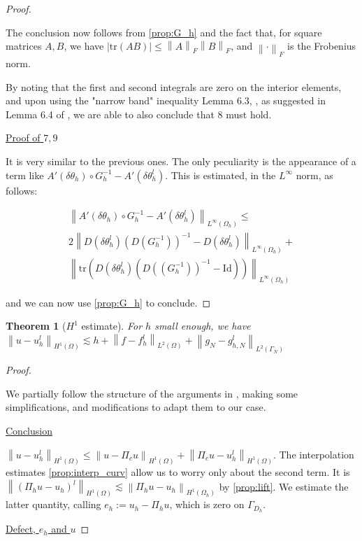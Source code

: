 \documentclass[english,a4paper,9pt,oneside]{scrbook}	%
\theoremstyle{break}
\newtheorem{thm}[equation]{Theorem}
\newenvironment{mproof}[1][\proofname]{%
  \begin{proof}[#1]$ $\par\nobreak\ignorespaces
}{%
  \end{proof}
}
\renewcommand*{\proofname}{Proof}
\theoremstyle{remark}
\newcommand{\norm}[1]{\left\lVert#1\right\rVert}
\newcommand{\tr}{\text{tr}}
\newcommand{\id}{\text{Id}}
\newcommand{\te}{\theta}
\begin{document}
\begin{appendices}
\begin{mproof}
The conclusion now follows from \cref{prop:G_h} and the fact that, for square matrices $A,B$, we have $|\tr(AB)|\leq \norm{A}_F\norm{B}_F$, and $\norm{\cdot }_F$ is the Frobenius norm.

By noting that the first and second integrals are zero on the interior elements, and upon using the "narrow band" inequality Lemma 6.3, \cite{elliott}, as suggested in  Lemma 6.4 of \cite{elliott}, we are able to also conclude that $8$ must hold.

\underline{Proof of $7, 9$}

It is very similar to the previous ones. The only peculiarity is the appearance of a term like $A'(\delta \te_h)\circ G_h^{-1} - A'(\delta \te_h^l)$. This is estimated, in the $L^\infty$ norm, as follows:

\begin{align*}
	\norm{A'(\delta \te_h)\circ G_h^{-1} - A'(\delta \te_h^l)}_{L^\infty(\Omega_h)}\leq\\
	2\norm{D(\delta \te_h^l)(D(G_h^{-1}))^{-1} - D(\delta \te_h^l)}_{L^\infty(\Omega_h)}+\\
	\norm{\tr(D(\delta \te_h^l)(D((G_h^{-1}))^{-1} - \id))}_{L^\infty(\Omega_h)}
\end{align*}

and we can now use \cref{prop:G_h} to conclude.

\end{mproof}

\begin{thm}[$H^1$ estimate]
\label{thm:H1_est_ell}
For $h$ small enough, we have $\norm{u-u_h^l}_{H^1(\Omega)} \lesssim h + \norm{f-f_h^l}_{L^2(\Omega)}+ \norm{g_N-g_{h,N}^l}_{L^2(\Gamma_N)}$
\end{thm}
\begin{mproof}

We partially follow the structure of the arguments in \cite{edelmann}, making some simplifications, and modifications to adapt them to our case.

\underline{Conclusion}

$\norm{u-u_h^l}_{H^1(\Omega)}\leq \norm{u-\Pi_c u }_{H^1(\Omega)}+\norm{\Pi_c u-u_h^l}_{H^1(\Omega)}$. The interpolation estimates \cref{prop:interp_curv} allow us to worry only about the second term. It is  $\norm{(\Pi_h u-u_h)^l}_{H^1(\Omega)}\lesssim \norm{\Pi_h u-u_h}_{H^1(\Omega_h)}$ by \cref{prop:lift}. We estimate the latter quantity, calling $e_h := u_h - \Pi_h u$, which is zero on $\Gamma_{D_h}$.

\underline{Defect, $e_h$ and $u$}


\end{mproof}
\end{appendices}
\end{document}
